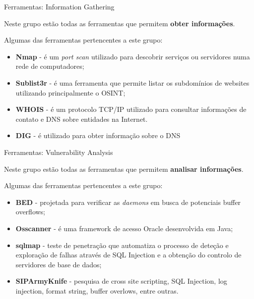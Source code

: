 \documentclass{beamer}
\begin{document}
\begin{frame}{Ferramentas: Information Gathering}

Neste grupo estão todas as ferramentas que permitem \textbf{obter informações}.

\hfill

Algumas das ferramentas pertencentes a este grupo:
    \begin{itemize}
        \justifying
        \item \textbf{Nmap} - é um \textit{port scan} utilizado para descobrir serviços ou servidores numa rede de computadores;
    \item \textbf{Sublist3r} - é uma ferramenta que permite listar os subdomínios de websites utilizando principalmente o OSINT;
        \item \textbf{WHOIS} - é um protocolo TCP/IP utilizado para consultar informações de contato e DNS sobre entidades na Internet.
        \item \textbf{DIG} - é utilizado para obter informação sobre o DNS
    \end{itemize}
\end{frame}
\begin{frame}{Ferramentas: Vulnerability Analysis}

Neste grupo estão todas as ferramentas que permitem \textbf{analisar informações}.

\hfill

Algumas das ferramentas pertencentes a este grupo:
    \begin{itemize}
        \justifying
        \item \textbf{BED} - projetada para verificar as \textit{daemons} em busca de potenciais buffer overflows;
        \item \textbf{Osscanner} - é uma framework de acesso Oracle desenvolvida em Java;
        \item \textbf{sqlmap} - teste de penetração que automatiza o processo de deteção e exploração de falhas através de SQL Injection e a obtenção do controlo de servidores de base de dados;
        \item \textbf{SIPArmyKnife} - pesquisa de cross site scripting, SQL Injection, log injection, format string, buffer overlows, entre outras.
    \end{itemize}
\end{frame}
\end{document}

